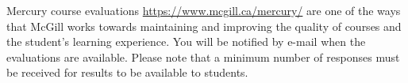 Mercury course evaluations \url{https://www.mcgill.ca/mercury/} are
one of the ways that McGill works towards maintaining and improving
the quality of courses and the student’s learning experience. You will
be notified by e-mail when the evaluations are available. Please note
that a minimum number of responses must be received for results to be
available to students.
